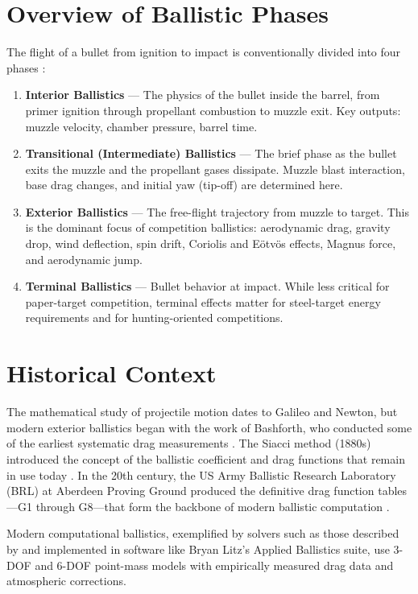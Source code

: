 \documentclass[11pt,twoside,openright]{report}
\begin{document}
\section{Overview of Ballistic Phases}

The flight of a bullet from ignition to impact is conventionally divided into four phases \citep{mccoy1999modern}:

\begin{enumerate}[label=\textbf{\arabic*.}]
  \item \textbf{Interior Ballistics} --- The physics of the bullet inside the barrel, from primer ignition through propellant combustion to muzzle exit. Key outputs: muzzle velocity, chamber pressure, barrel time.
  \item \textbf{Transitional (Intermediate) Ballistics} --- The brief phase as the bullet exits the muzzle and the propellant gases dissipate. Muzzle blast interaction, base drag changes, and initial yaw (tip-off) are determined here.
  \item \textbf{Exterior Ballistics} --- The free-flight trajectory from muzzle to target. This is the dominant focus of competition ballistics: aerodynamic drag, gravity drop, wind deflection, spin drift, Coriolis and E\"otv\"os effects, Magnus force, and aerodynamic jump.
  \item \textbf{Terminal Ballistics} --- Bullet behavior at impact. While less critical for paper-target competition, terminal effects matter for steel-target energy requirements and for hunting-oriented competitions.
\end{enumerate}

\section{Historical Context}

The mathematical study of projectile motion dates to Galileo and Newton, but modern exterior ballistics began with the work of Bashforth, who conducted some of the earliest systematic drag measurements \citep{bashforth1870description}. The Siacci method (1880s) introduced the concept of the ballistic coefficient and drag functions that remain in use today \citep{siacci1888balistica}. In the 20th century, the US Army Ballistic Research Laboratory (BRL) at Aberdeen Proving Ground produced the definitive drag function tables---G1 through G8---that form the backbone of modern ballistic computation \citep{mccoy1999modern, ingalls1893exterior}.

Modern computational ballistics, exemplified by solvers such as those described by \citet{litz2015applied} and implemented in software like Bryan Litz's Applied Ballistics suite, use 3-DOF and 6-DOF point-mass models with empirically measured drag data and atmospheric corrections.
\end{document}
